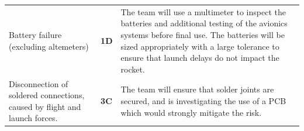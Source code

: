\begin{table}[htbp]
\begin{tabularx}{\linewidth}{X >{\centering\arraybackslash}m{1in} X}
  Battery failure (excluding altemeters) & \cellcolor{orange!25}\textbf{\newline \newline  \newline \newline  1D} & The team will use a multimeter to inspect the batteries and additional testing of the avionics systems before final use. The batteries will be sized appropriately with a large tolerance to ensure that launch delays do not impact the rocket. \\
  Disconnection of soldered connections, caused by flight and launch forces. & \cellcolor{orange!25}\textbf{\newline \newline \newline 3C} & The team will ensure that solder joints are secured, and is investigating the use of a PCB which would strongly mitigate the risk. \\

      \bottomrule
      \end{tabularx}%
    \label{tab:addlabel}%
  \end{table}%

  


